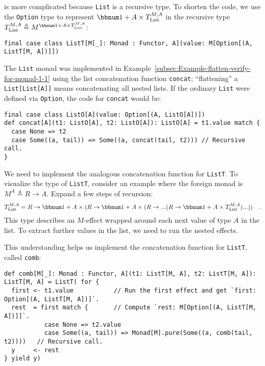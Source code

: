is more complicated because \lstinline!List! is a recursive type.
To shorten the code, we use the \lstinline!Option! type to represent
$\bbnum 1+A\times T_{\text{List}}^{M,A}$ in the recursive type $T_{\text{List}}^{M,A}\triangleq M^{\bbnum 1+A\times T_{\text{List}}^{M,A}}$:
\begin{lstlisting}
final case class ListT[M[_]: Monad : Functor, A](value: M[Option[(A, ListT[M, A])]])
\end{lstlisting}
The \lstinline!List! monad was implemented in Example~\ref{subsec:Example-flatten-verify-for-monad-1-1}
using the list concatenation function \lstinline!concat!; \textsf{``}flattening\textsf{''}
a \lstinline!List[List[A]]! means concatenating all nested lists.
If the ordinary \lstinline!List! were defined via \lstinline!Option!,
the code for \lstinline!concat! would be:
\begin{lstlisting}
final case class ListO[A](value: Option[(A, ListO[A])])
def concat[A](t1: ListO[A], t2: ListO[A]): ListO[A] = t1.value match {
  case None => t2
  case Some((a, tail)) => Some((a, concat(tail, t2))) // Recursive call.
}
\end{lstlisting}
We need to implement the analogous concatenation function for \lstinline!ListT!.
To visualize the type of \lstinline!ListT!, consider an example where
the foreign monad is $M^{A}\triangleq R\rightarrow A$. Expand a few
steps of recursion:
\[
T_{\text{List}}^{M,A}=R\rightarrow\bbnum 1+A\times(R\rightarrow\bbnum 1+A\times(R\rightarrow...(R\rightarrow\bbnum 1+A\times T_{\text{List}}^{M,A})...))\quad.
\]
This type describes an $M$-effect wrapped around each next value
of type $A$ in the list. To extract further values in the list, we
need to run the nested effects.

This understanding helps us implement the concatenation function for
\lstinline!ListT!, called \lstinline!comb!:
\begin{lstlisting}
def comb[M[_]: Monad : Functor, A](t1: ListT[M, A], t2: ListT[M, A]): ListT[M, A] = ListT( for {
  first <- t1.value           // Run the first effect and get `first: Option[(A, ListT[M, A])]`.
  rest  = first match {       // Compute `rest: M[Option[(A, ListT[M, A])]]`.
           case None => t2.value
           case Some((a, tail)) => Monad[M].pure(Some((a, comb(tail, t2))))   // Recursive call.
  y     <- rest
} yield y)
\end{lstlisting}

